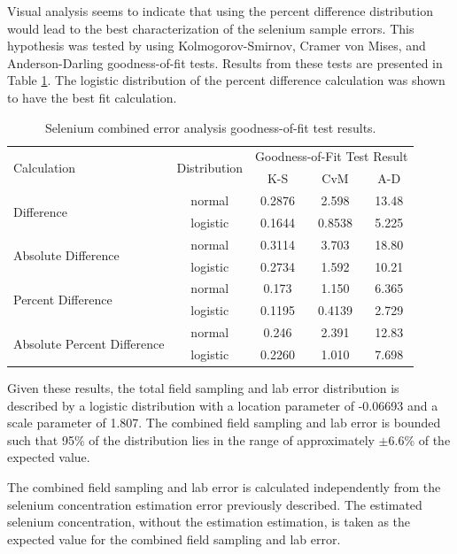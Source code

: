 \begin{linenumbers}
Visual analysis seems to indicate that using the percent difference distribution would lead to the best characterization of the selenium sample errors.  This hypothesis was tested by using Kolmogorov-Smirnov, Cramer von Mises, and Anderson-Darling goodness-of-fit tests.  Results from these tests are presented in Table \ref{tab:CSeGoF}.  The logistic distribution of the percent difference calculation was shown to have the best fit calculation.

\begin{table}
  \caption[Selenium combined error analysis goodness-of-fit test results.]{Selenium combined error analysis goodness-of-fit test results.}
  \label{tab:CSeGoF}
  \centering
    \begin{tabular}{lcccc}
    \toprule
    \multirow{2}{*}{Calculation} & \multirow{2}{*}{Distribution} & \multicolumn{3}{c}{Goodness-of-Fit Test Result}\\ \cline{3-5}
     & & K-S & CvM & A-D\\
    \midrule
    \midrule
    \multirow{2}{*}{Difference} & normal & 0.2876 & 2.598 & 13.48\\
     & logistic & 0.1644 & 0.8538 & 5.225\\
    \midrule
    \multirow{2}{*}{Absolute Difference} & normal & 0.3114 & 3.703 & 18.80\\
     & logistic & 0.2734 & 1.592 & 10.21\\
    \midrule    
    \multirow{2}{*}{Percent Difference} & normal & 0.173 & 1.150 & 6.365\\
     & logistic & 0.1195 & 0.4139 & 2.729\\
    \midrule     
    \multirow{2}{*}{Absolute Percent Difference} & normal & 0.246 & 2.391 & 12.83\\
     & logistic & 0.2260 & 1.010 & 7.698\\
    \bottomrule
    \end{tabular}%
\end{table}%

Given these results, the total field sampling and lab error distribution is described by a logistic distribution with a location parameter of -0.06693 and a scale parameter of 1.807.  The combined field sampling and lab error is bounded such that 95\% of the distribution lies in the range of approximately $\pm$6.6\% of the expected value.

The combined field sampling and lab error is calculated independently from the selenium concentration estimation error previously described.  The estimated selenium concentration, without the estimation estimation, is taken as the expected value for the combined field sampling and lab error. 


\end{linenumbers}

